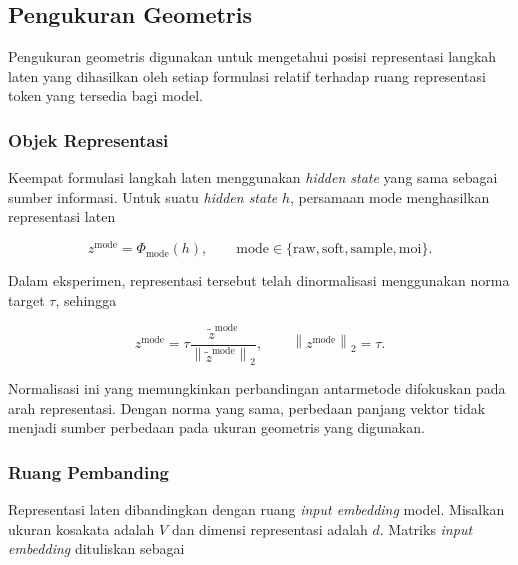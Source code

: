 \subsection{Pengukuran Geometris}
\label{subsec:pengukuran-geometris}

Pengukuran geometris digunakan untuk mengetahui posisi representasi langkah
laten yang dihasilkan oleh setiap formulasi relatif terhadap ruang representasi
token yang tersedia bagi model.

\subsubsection{Objek Representasi}

Keempat formulasi langkah laten menggunakan \textit{hidden state} yang sama
sebagai sumber informasi. Untuk suatu \textit{hidden state} $h$, persamaan
$\mathrm{mode}$ menghasilkan representasi laten

\begin{equation}
    z^{\mathrm{mode}}
    =
    \Phi_{\mathrm{mode}}(h),
    \qquad
    \mathrm{mode}
    \in
    \{
        \mathrm{raw},
        \mathrm{soft},
        \mathrm{sample},
        \mathrm{moi}
    \}.
    \label{eq:geo-objek-representasi}
\end{equation}

Dalam eksperimen, representasi tersebut telah dinormalisasi menggunakan norma
target $\tau$, sehingga

\begin{equation}
    z^{\mathrm{mode}}
    =
    \tau
    \frac{
        \widetilde{z}^{\mathrm{mode}}
    }{
        \left\|
            \widetilde{z}^{\mathrm{mode}}
        \right\|_2
    },
    \qquad
    \left\|
        z^{\mathrm{mode}}
    \right\|_2
    =
    \tau.
    \label{eq:geo-normalisasi}
\end{equation}

Normalisasi ini yang memungkinkan perbandingan antarmetode
difokuskan pada arah representasi. Dengan norma yang sama, perbedaan panjang
vektor tidak menjadi sumber perbedaan pada ukuran geometris yang digunakan.

\subsubsection{Ruang Pembanding}

Representasi laten dibandingkan dengan ruang \textit{input embedding} model.
Misalkan ukuran kosakata adalah $V$ dan dimensi representasi adalah $d$.
Matriks \textit{input embedding} dituliskan sebagai

